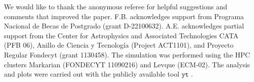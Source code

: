 \documentclass[twocolumn]{aastex}
\begin{document}
We would like to thank the anonymous referee for helpful suggestions and comments that improved the paper. F.B. acknowledges support from Programa Nacional de Becas de Postgrado (grant D-22100632). A.E. acknowledges partial support from the Center for Astrophysics and Associated Technologies CATA (PFB 06), Anillo de Ciencia y Tecnolog\'ia (Project ACT1101), and Proyecto Regular Fondecyt (grant 1130458). The simulation was performed using the HPC clusters Markarian (FONDECYT 11090216) and Levque (ECM-02). The analysis and plots were carried out with the publicly available tool $\mathtt{yt}$ \citep{Turk_11}.



\end{document}
